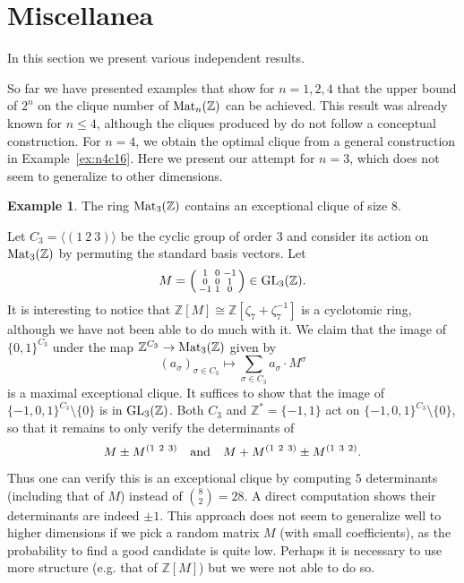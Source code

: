 \documentclass{amsart}
\theoremstyle{plain}
\theoremstyle{definition}
\newtheorem{example}[theorem]{Example}
\newcommand{\Z}{\ensuremath{\mathbb{Z}}}
\begin{document}
\section{Miscellanea}\label{sec:miscellanea}

In this section we present various independent results.

So far we have presented examples that show for \(n=1,2,4\) that the upper bound of \(2^n\) on the clique number of \(\textup{Mat}_n(\Z)\) can be achieved. This result was already known for \(n\leq 4\), although the cliques produced by \cite{BC24} do not follow a conceptual construction. For \(n=4\), we obtain the optimal clique from a general construction in Example~\ref{ex:n4c16}. Here we present our attempt for \(n=3\), which does not seem to generalize to other dimensions.

\begin{example}\label{ex:n3c8}
	The ring \(\textup{Mat}_3(\Z)\) contains an exceptional clique of size \(8\).
	
	Let \(C_3=\langle(1\ 2\ 3)\rangle\) be the cyclic group of order \(3\) and consider its action on \(\textup{Mat}_3(\Z)\) by permuting the standard basis vectors. Let 
	\[M = \left(\begin{smallmatrix} 1 & 0 & -1 \\ 0 & 0 & 1 \\ -1 & 1 & 0\end{smallmatrix}\right) \in \textup{GL}_3(\Z).\]
	It is interesting to notice that \(\Z[M]\cong\Z[\zeta_7+\zeta_7^{-1}]\) is a cyclotomic ring, although we have not been able to do much with it.
	We claim that the image of \(\{0,1\}^{C_3}\) under the map \(\Z^{C_3}\to\textup{Mat}_3(\Z)\) given by 
	\[(a_\sigma)_{\sigma\in C_3} \mapsto \sum_{\sigma\in C_3} a_{\sigma} \cdot M^\sigma\] 
	is a maximal exceptional clique.
	It suffices to show that the image of \(\{-1,0,1\}^{C_3}\setminus\{0\}\) is in \(\textup{GL}_3(\Z)\).
	Both \(C_3\) and \(\Z^*=\{-1,1\}\) act on \(\{-1,0,1\}^{C_3}\setminus\{0\}\), so that it remains to only verify the determinants of
	\[ M\pm M^{(1\ 2\ 3)} \quad\textup{and}\quad M+M^{(1\ 2\ 3)}\pm M^{(1\ 3\ 2)}.\]
	Thus one can verify this is an exceptional clique by computing \(5\) determinants (including that of $M$) instead of \(\binom{8}{2}=28\). A direct computation shows their determinants are indeed $\pm 1$. 
	This approach does not seem to generalize well to higher dimensions if we pick a random matrix $M$ (with small coefficients), as the probability to find a good candidate is quite low. Perhaps it is necessary to use more structure (e.g. that of $\Z[M]$) but we were not able to do so.
\end{example}
\end{document}
